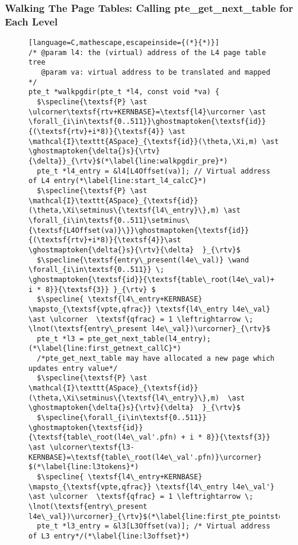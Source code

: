 \subsubsection{Walking The Page Tables: Calling \textsf{pte\_get\_next\_table} for Each Level}
\label{wlkpgdirC}
\begin{figure}\footnotesize
\ifPLDI
\begin{lstlisting}[language=C,mathescape,escapeinside={(*}{*)}]
/* @param l4: the (virtual) address of the L4 page table tree
   @param va: virtual address to be translated and mapped */
pte_t *walkpgdir(pte_t *l4, const void *va) {
  $\specline{\textsf{P} \ast \ulcorner\textsf{rtv+KERNBASE}=\textsf{l4}\urcorner \ast \forall_{i\in\textsf{0..511}}\ghostmaptoken{\textsf{id}}{(\textsf{rtv}+i*8)}{\textsf{4}} \ast \mathcal{I}\texttt{ASpace}_{\textsf{id}}(\theta,\Xi,m) \ast \ghostmaptoken{\delta{}s}{\rtv}{\delta}}_{\rtv}$(*\label{line:walkpgdir_pre}*)
  pte_t *l4_entry = &l4[L4Offset(va)]; // Virtual address of L4 entry(*\label{line:start_l4_calcC}*)
  $\specline{\textsf{P} \ast \mathcal{I}\texttt{ASpace}_{\textsf{id}}(\theta,\Xi\setminus\{\textsf{l4\_entry}\},m) \ast \forall_{i\in\textsf{0..511}\setminus\{\textsf{L4Offset(va)}\}}\ghostmaptoken{\textsf{id}}{(\textsf{rtv}+i*8)}{\textsf{4}}\ast \ghostmaptoken{\delta{}s}{\rtv}{\delta}  }_{\rtv}$
  $\specline{\textsf{entry\_present(l4e\_val)} \wand \forall_{i\in\textsf{0..511}} \; \ghostmaptoken{\textsf{id}}{\textsf{table\_root(l4e\_val)+ i * 8}}{\textsf{3}} }_{\rtv} $
  $\specline{ \textsf{l4\_entry+KERNBASE} \mapsto_{\textsf{vpte,qfrac}} \textsf{l4\_entry l4e\_val} \ast \ulcorner  \textsf{qfrac} = 1 \leftrightarrow \; \lnot(\textsf{entry\_present l4e\_val})\urcorner}_{\rtv}$    
  pte_t *l3 = pte_get_next_table(l4_entry); (*\label{line:first_getnext_callC}*) 
  /*pte_get_next_table may have allocated a new page which updates entry value*/
  $\specline{\textsf{P} \ast \mathcal{I}\texttt{ASpace}_{\textsf{id}}(\theta,\Xi\setminus\{\textsf{l4\_entry}\},m)  \ast \ghostmaptoken{\delta{}s}{\rtv}{\delta}  }_{\rtv}$
  $\specline{\forall_{i\in\textsf{0..511}} \ghostmaptoken{\textsf{id}}{\textsf{table\_root(l4e\_val'.pfn) + i * 8}}{\textsf{3}}  \ast \ulcorner\textsf{l3-KERNBASE}=\textsf{table\_root(l4e\_val'.pfn)}\urcorner} $(*\label{line:l3tokens}*)
  $\specline{ \textsf{l4\_entry+KERNBASE} \mapsto_{\textsf{vpte,qfrac}} \textsf{l4\_entry l4e\_val'} \ast \ulcorner  \textsf{qfrac} = 1 \leftrightarrow \; \lnot(\textsf{entry\_present l4e\_val})\urcorner}_{\rtv}$(*\label{line:first_pte_pointstoC}*)
  pte_t *l3_entry = &l3[L3Offset(va)]; /* Virtual address of L3 entry*/(*\label{line:l3offset}*)

\end{lstlisting}
\end{figure}
